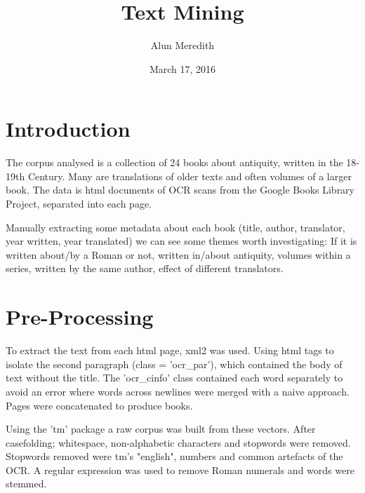 \documentclass{sig-alternate-05-2015}
\begin{document}
\author{Alun Meredith\vspace{-2ex}%
}
\date{March 17, 2016 \vspace{-4ex}}
\title{Text Mining \vspace{-2ex}%
}
\maketitle
\small


\maketitle

\section{Introduction}
The corpus analysed is a collection of 24 books about antiquity, written in the 18-19th Century. Many are translations of older texts and often volumes of a larger book. The data is html documents of OCR scans from the Google Books Library Project, separated into each page.

Manually extracting some metadata about each book (title, author, translator, year written, year translated) we can see some themes worth investigating: If it is written about/by a Roman or not, written in/about antiquity, volumes within a series, written by the same author, effect of different translators.

\section{Pre-Processing}
To extract the text from each html page, xml2\cite{xml2} was used. Using html tags to isolate the second paragraph (class = 'ocr\_par'), which contained the body of text without the title. The 'ocr\_cinfo' class contained each word separately to avoid an error where words across newlines were merged with a naive approach. Pages were concatenated to produce books.

Using the 'tm' package\cite{tm} a raw corpus was built from these vectors. After casefolding; whitespace, non-alphabetic characters and stopwords were removed. Stopwords removed were tm's "english", numbers and common artefacts of the OCR. A regular expression was used to remove Roman numerals and words were stemmed.
\end{document}
